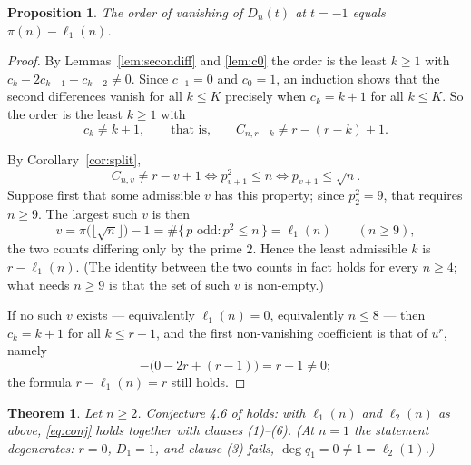 \documentclass[a4paper,11pt,oneside,reqno]{amsart}
\theoremstyle{definition}
\theoremstyle{remark}
\theoremstyle{plain}
\newtheorem{theorem}[definition]{Theorem}
\newtheorem{proposition}[definition]{Proposition}
\begin{document}
\begin{proposition}\label{prop:order}
  The order of vanishing of \(D_n(t)\) at \(t = -1\) equals \(\pi(n)-\ell_1(n)\).
\end{proposition}

\begin{proof}
  By Lemmas~\ref{lem:secondiff} and \ref{lem:c0} the order is the least
  \(k \ge 1\) with \(c_k-2c_{k-1}+c_{k-2} \ne 0\). Since \(c_{-1} = 0\) and
  \(c_0 = 1\), an induction shows that the second differences vanish for all
  \(k \le K\) precisely when \(c_k = k+1\) for all \(k \le K\). So the order is the
  least \(k \ge 1\) with
  \[
    c_k \ne k+1,\qquad\text{that is,}\qquad C_{n,r-k} \ne r-(r-k)+1 .
  \]

  By Corollary~\ref{cor:split},
  \[
    C_{n,v} \ne r-v+1
    \iff p_{v+1}^{2} \le n
    \iff p_{v+1} \le \sqrt n .
  \]
  Suppose first that some admissible \(v\) has this property; since
  \(p_2^{2} = 9\), that requires \(n \ge 9\). The largest such \(v\) is then
  \[
    v = \pi\bigl(\lfloor\sqrt n\rfloor\bigr)-1
     =\#\{\,p\text{ odd} : p^{2} \le n\,\} = \ell_1(n)
     \qquad(n \ge 9),
  \]
  the two counts differing only by the prime \(2\). Hence the least admissible
  \(k\) is \(r-\ell_1(n)\). (The identity between the two counts in fact holds
  for every \(n \ge 4\); what needs \(n \ge 9\) is that the set of such \(v\) is
  non-empty.)

  If no such \(v\) exists --- equivalently \(\ell_1(n) = 0\), equivalently
  \(n \le 8\) --- then \(c_k = k+1\) for all
  \(k \le r-1\), and the first non-vanishing coefficient is that of \(u^{r}\),
  namely
  \[
    -\bigl(0-2r+(r-1)\bigr) = r+1 \ne 0;
  \]
  the formula \(r-\ell_1(n) = r\) still holds.
\end{proof}

\begin{theorem}\label{thm:conj}
  Let \(n \ge 2\). Conjecture 4.6 of \cite{Snellman2000} holds: with
  \(\ell_1(n)\) and \(\ell_2(n)\) as above, \eqref{eq:conj} holds together with
  clauses (1)--(6). (At \(n = 1\) the statement degenerates: \(r = 0\), \(D_1 = 1\),
  and clause (3) fails, \(\deg q_1 = 0 \ne 1 = \ell_2(1)\).)
\end{theorem}
\end{document}
